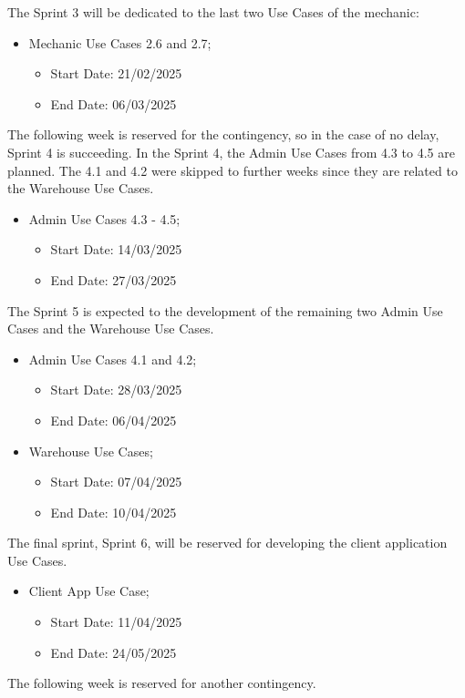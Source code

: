 The Sprint 3 will be dedicated to the last two Use Cases of the mechanic:  

  \begin{itemize}
    \item Mechanic Use Cases 2.6 and 2.7;
    \begin{itemize}
      \item Start Date: 21/02/2025 
      \item End Date: 06/03/2025 
  \end{itemize}
\end{itemize}

The following week is reserved for the contingency, so in the case of no delay, Sprint 4 is succeeding.
In the Sprint 4, the Admin Use Cases from 4.3 to 4.5 are planned. The 4.1 and 4.2 were skipped to further weeks since they are related to the Warehouse Use Cases.

    \begin{itemize}
      \item Admin Use Cases 4.3 - 4.5;
    \begin{itemize}
      \item Start Date: 14/03/2025 
      \item End Date: 27/03/2025 
  \end{itemize}
\end{itemize}

The Sprint 5 is expected to the development of the remaining two Admin Use Cases and the Warehouse Use Cases.

\begin{itemize}
  \item Admin Use Cases 4.1 and 4.2;
  \begin{itemize}
    \item Start Date: 28/03/2025 
    \item End Date: 06/04/2025 
  \end{itemize}
  \item Warehouse Use Cases;
  \begin{itemize}
    \item Start Date: 07/04/2025 
    \item End Date: 10/04/2025 
  \end{itemize}
\end{itemize}

The final sprint, Sprint 6, will be reserved for developing the client application Use Cases.

\begin{itemize}
  \item Client App Use Case;
  \begin{itemize}
    \item Start Date: 11/04/2025  
    \item End Date: 24/05/2025 
  \end{itemize} 
\end{itemize}
The following week is reserved for another contingency.

